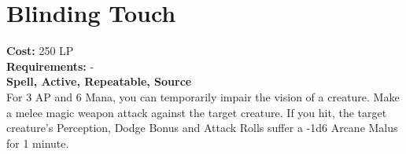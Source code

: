 \section{Blinding Touch}\label{spell:blindingtouch}
\textbf{Cost:} 250 LP\\
\textbf{Requirements:} -\\
\textbf{Spell, Active, Repeatable, Source}\\
For 3 AP and 6 Mana, you can temporarily impair the vision of a creature.
Make a melee magic weapon attack against the target creature.
If you hit, the target creature's Perception, Dodge Bonus and Attack Rolls suffer a -1d6 Arcane Malus for 1 minute.\\